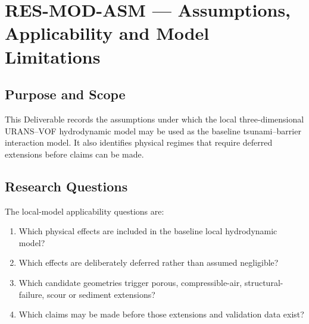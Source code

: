 
\section{RES-MOD-ASM --- Assumptions, Applicability and Model Limitations}
\label{sec:res-mod-asm}

\subsection{Purpose and Scope}
\label{sec:res-mod-asm-purpose}


This Deliverable records the assumptions under which the local
three-dimensional URANS--VOF hydrodynamic model may be used as the
baseline tsunami--barrier interaction model. It also identifies
physical regimes that require deferred extensions before claims can be
made.

\subsection{Research Questions}
\label{sec:res-mod-asm-research-questions}


The local-model applicability questions are:

\begin{enumerate}
  \item Which physical effects are included in the baseline local
    hydrodynamic model?
  \item Which effects are deliberately deferred rather than assumed
    negligible?
  \item Which candidate geometries trigger porous, compressible-air,
    structural-failure, scour or sediment extensions?
  \item Which claims may be made before those extensions and validation
    data exist?
\end{enumerate}

